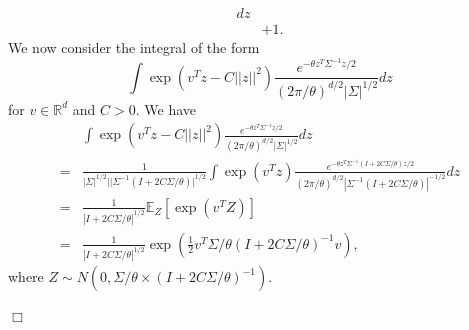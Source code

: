 \documentclass[12pt]{article}
\newenvironment {proof}{{\noindent\bf Proof }}{\hfill $\Box$ \medskip}
\newcommand{\covq}{\Sigma}     %
\begin{document}
\begin{proof}
\begin{align}
{    }
dz\\
&+1.
\end{align}
We now consider the integral of the form 
\begin{equation}
\int \exp(v^{T}z-C||z||^2) \frac{
        e^{-\theta z^{T}\covq^{-1}z  / 2}
    }{
        (2 \pi/ \theta)^{d/2} |\covq|^{1/2}
    }
dz   
\end{equation}
for $v \in \mathbb{R}^d$ and $C>0$. 
We have 
\begin{equation}
\begin{aligned}
&\int \exp(v^{T}z-C||z||^2) \frac{
        e^{-\theta z^{T}\covq^{-1}z  / 2}
    }{
        (2 \pi/ \theta)^{d/2} |\covq|^{1/2}
    }
dz\\
=&\frac{1}{|\covq|^{1/2}|  |\covq^{-1}(I+2C\covq/\theta )|^{1/2}  }\int \exp(v^{T}z) \frac{
        e^{-\theta z^{T}\covq^{-1}(I+2C\covq/\theta )z  / 2}
    }{
        (2 \pi/ \theta)^{d/2}|\covq^{-1}(I+2C\covq/\theta )|^{-1/2} 
    }
dz\\
=& \frac{1}{|I+2C\covq/\theta |^{1/2}} \mathbb{E}_{Z}[\exp (v^{T}Z)]\\
=&\frac{1}{|I+2C\covq/\theta |^{1/2}}
\exp 
\left(
\frac{1}{2}v^{T}\covq/\theta(I+2C\covq/\theta )^{-1}v
\right),
\end{aligned}
\end{equation}
where $Z \sim N(0, \covq/\theta \times (I+2C\covq/\theta )^{-1})$.


\end{proof}
\end{document}
